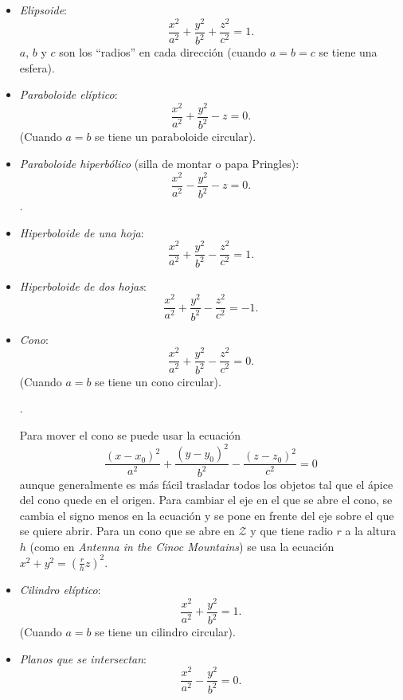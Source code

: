 \documentclass[10pt,letterpaper,twocolumn]{article}
\begin{document}
\begin{itemize}
    \item \emph{Elipsoide}: $$ \frac{x^2}{a^2} + \frac{y^2}{b^2} + \frac{z^2}{c^2} = 1.$$
    $a$, $b$ y $c$ son los  ``radios'' en cada dirección (cuando $a = b = c$ se tiene una esfera).
    \item \emph{Paraboloide elíptico}: $$ \frac{x^2}{a^2} + \frac{y^2}{b^2} - z = 0.$$ (Cuando $a = b$ se tiene un paraboloide circular).
    \item \emph{Paraboloide hiperbólico} (\small{silla de montar o papa Pringles}): $$ \frac{x^2}{a^2} - \frac{y^2}{b^2} - z = 0.$$.
    \item \emph{Hiperboloide de una hoja}: $$ \frac{x^2}{a^2} + \frac{y^2}{b^2} - \frac{z^2}{c^2} = 1.$$
    \item \emph{Hiperboloide de dos hojas}: $$ \frac{x^2}{a^2} + \frac{y^2}{b^2} - \frac{z^2}{c^2} = -1.$$
    \item \emph{Cono}: $$ \frac{x^2}{a^2} + \frac{y^2}{b^2} - \frac{z^2}{c^2} = 0.$$ (Cuando $a = b$ se tiene un cono circular).
    
    .
    
    Para mover el cono se puede usar la ecuación $$ \frac{(x - x_0)^2}{a^2} + \frac{(y - y_0)^2}{b^2} - \frac{(z - z_0)^2}{c^2} = 0$$ aunque generalmente es más fácil trasladar todos los objetos tal que el ápice del cono quede en el origen. Para cambiar el eje en el que se abre el cono, se cambia el signo menos en la ecuación y se pone en frente del eje sobre el que se quiere abrir. Para un cono que se abre en $\mathcal{Z}$ y que tiene radio $r$ a la altura $h$ (como en \emph{Antenna in the Cinoc Mountains}) se usa la ecuación $ \displaystyle x^2 + y^2 = (\frac{r}{h}z)^2.$
    
    \item \emph{Cilindro elíptico}: $$ \frac{x^2}{a^2} + \frac{y^2}{b^2} = 1.$$ (Cuando $a = b$ se tiene un cilindro circular).
    \item \emph{Planos que se intersectan}: $$ \frac{x^2}{a^2} - \frac{y^2}{b^2} = 0. $$
    
\end{itemize}
\end{document}
